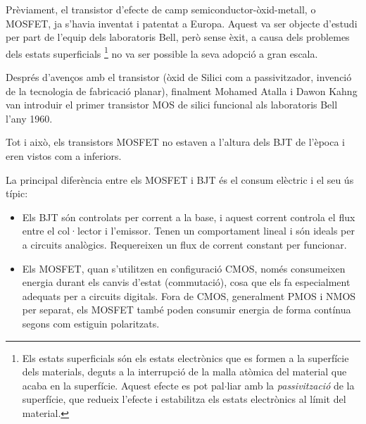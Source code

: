 \documentclass[11pt,a4paper]{article}
\begin{document}
Prèviament, el transistor d'efecte de camp semiconductor-òxid-metall, o MOSFET, ja s'havia inventat i patentat a Europa. Aquest va ser objecte d'estudi per part de l'equip dels laboratoris Bell, però sense èxit, a causa dels problemes dels estats superficials \footnote{Els estats superficials són els estats electrònics que es formen a la superfície dels materials, deguts a la interrupció de la malla atòmica del material que acaba en la superfície. Aquest efecte es pot pal$\cdot$liar amb la \textit{passivització} de la superfície, que redueix l'efecte i estabilitza els estats electrònics al límit del material.} no va ser possible la seva adopció a gran escala.

Després d'avenços amb el transistor (òxid de Silici com a passivitzador, invenció de la tecnologia de fabricació planar), finalment Mohamed Atalla i Dawon Kahng van introduir el primer transistor MOS de silici funcional als laboratoris Bell l'any 1960. 

Tot i això, els transistors MOSFET no estaven a l'altura dels BJT de l'època i eren vistos com a inferiors. 

La principal diferència entre els MOSFET i BJT és el consum elèctric i el seu ús típic: 
\begin{itemize}
    \item Els BJT són controlats per corrent a la base, i aquest corrent controla el flux entre el col·lector i l'emissor. Tenen un comportament lineal i són ideals per a circuits analògics. Requereixen un flux de corrent constant per funcionar.
    \item Els MOSFET, quan s'utilitzen en configuració CMOS, només consumeixen energia durant els canvis d'estat (commutació), cosa que els fa especialment adequats per a circuits digitals. Fora de CMOS, generalment PMOS i NMOS per separat, els MOSFET també poden consumir energia de forma contínua segons com estiguin polaritzats.
\end{itemize}
\end{document}
